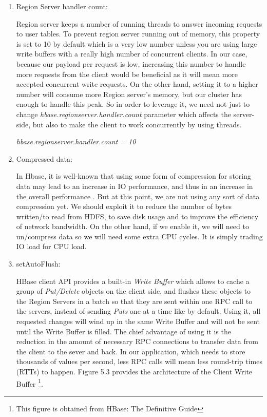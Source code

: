 \begin{enumerate}
\item{Region Server handler count:}
\par
Region server keeps a number of running threads to answer incoming requests to user tables. To prevent region server running out of memory, this property is set to 10 by default which is a very low number unless you are using large write buffers with a really high number of concurrent clients. In our case, because our payload per request is low, increasing this number to handle more requests from the client would be beneficial as it will mean more accepted concurrent write requests. On the other hand, setting it to a higher number will consume more Region server's memory, but our cluster has enough to handle this peak. So in order to leverage it, we need not just to change \textit{hbase.regionserver.handler.count} parameter which affects the server-side, but also to make the client to work concurrently by using threads.

\bigskip

\centerline{\textit{hbase.regionserver.handler.count = 10}}
\bigskip
\item Compressed data:
\par
In Hbase, it is well-known that using some form of compression for storing data may lead to an increase in IO performance, and thus in an increase in the overall performance \cite{raichand2013short} \cite{cheng2013key} \cite{aiyer2012storage} \cite{ApacheHBaseCompression}. But at this point, we are not using any sort of data compression yet. We should exploit it to reduce the number of bytes written/to read from HDFS, to save disk usage and to improve the efficiency of network bandwidth. On the other hand, if we enable it, we will need to un/compress data so we will need some extra CPU cycles. It is simply trading IO load for CPU load.

 \bigskip

\item setAutoFlush:
\par
HBase client API provides a built-in \textit{Write Buffer} which allows to cache a group of \textit{Put/Delete} objects on the client side, and flushes these objects to the Region Servers in a batch so that they are sent within one RPC call to the servers, instead of sending \textit{Puts} one at a time like by default. Using it, all requested changes will wind up in the same Write Buffer and will not be sent until the Write Buffer is filled. The chief advantage of using it is the reduction in the amount of necessary RPC connections to transfer data from the client to the sever and back. In our application, which needs to store thousands of values per second, less RPC calls will mean less round-trip times (RTTs) to happen. Figure 5.3 provides the architecture of the Client Write Buffer \footnote{This figure is obtained from HBase: The Definitive Guide}.


\end{enumerate}
